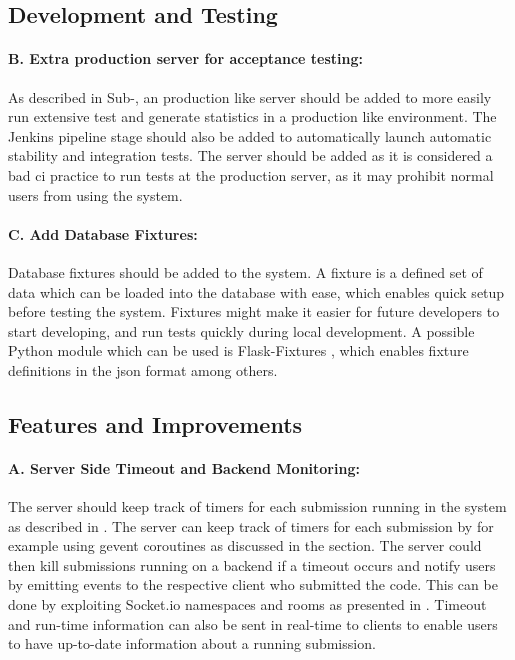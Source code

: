 \subsection*{Development and Testing}
\paragraph*{B. Extra production server for acceptance testing:} As described in Sub-, an production like server should be added to more easily run extensive test and generate statistics in a production like environment. The Jenkins pipeline stage should also be added to automatically launch automatic stability and integration tests. The server should be added as it is considered a bad \gls{ci} practice to run tests at the production server, as it may prohibit normal users from using the system.

\paragraph*{C. Add Database Fixtures:} Database fixtures should be added to the system. A fixture is a defined set of data which can be loaded into the database with ease, which enables quick setup before testing the system. Fixtures might make it easier for future developers to start developing, and run tests quickly during local development. A possible Python module which can be used is Flask-Fixtures \cite{FLASK-FIXTURES}, which enables fixture definitions in the \gls{json} format among others.

\subsection*{Features and Improvements}
\paragraph*{A. Server Side Timeout and Backend Monitoring:} The server should keep track of timers for each submission running in the system as described in . The server can keep track of timers for each submission by for example using gevent coroutines \cite{GEVENT} as discussed in the section. The server could then kill submissions running on a backend if a timeout occurs and notify users by emitting events to the respective client who submitted the code. This can be done by exploiting Socket.io namespaces and rooms as presented in . Timeout and run-time information can also be sent in real-time to clients to enable users to have up-to-date information about a running submission.

